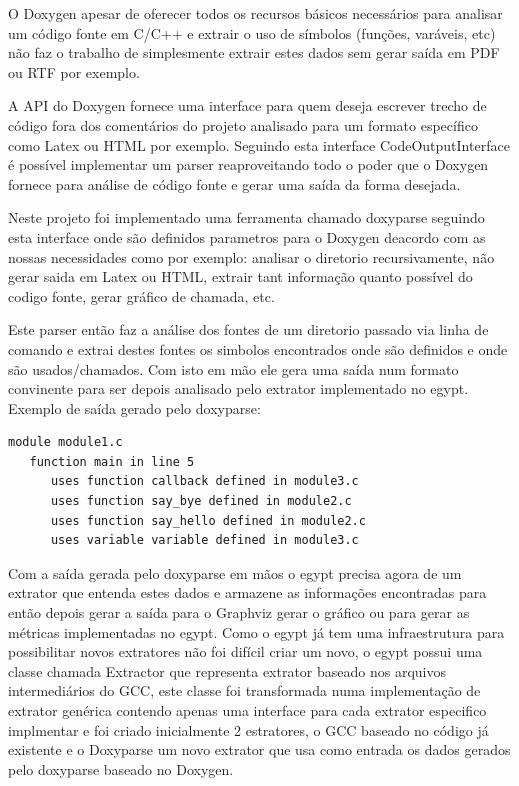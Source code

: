O Doxygen apesar de oferecer todos os recursos básicos necessários para analisar um código fonte em C/C++ e extrair o uso de símbolos (funções, varáveis, etc) não faz o trabalho de simplesmente extrair estes dados sem gerar saída em PDF ou RTF por exemplo.

A API do Doxygen fornece uma interface para quem deseja escrever trecho de código fora dos comentários do projeto analisado para um formato específico como Latex ou HTML por exemplo. Seguindo esta interface CodeOutputInterface é possível implementar um parser reaproveitando todo o poder que o Doxygen fornece para análise de código fonte e gerar uma saída da forma desejada.

Neste projeto foi implementado uma ferramenta chamado doxyparse seguindo esta interface onde são definidos parametros para o Doxygen deacordo com as nossas necessidades como por exemplo: analisar o diretorio recursivamente, não gerar saida em Latex ou HTML, extrair tant informação quanto possível do codigo fonte, gerar gráfico de chamada, etc.

Este parser então faz a análise dos fontes de um diretorio passado via linha de comando e extrai destes fontes os simbolos encontrados onde são definidos e onde são usados/chamados. Com isto em mão ele gera uma saída num formato convinente para ser depois analisado pelo extrator implementado no egypt. Exemplo de saída gerado pelo doxyparse:

\begin{verbatim}
module module1.c
   function main in line 5
      uses function callback defined in module3.c
      uses function say_bye defined in module2.c
      uses function say_hello defined in module2.c
      uses variable variable defined in module3.c
\end{verbatim}

Com a saída gerada pelo doxyparse em mãos o egypt precisa agora de um extrator que entenda estes dados e armazene as informações encontradas para então depois gerar a saída para o Graphviz gerar o gráfico ou para gerar as métricas implementadas no egypt. Como o egypt já tem uma infraestrutura para possibilitar novos extratores não foi difícil criar um novo, o egypt possui uma classe chamada Extractor que representa extrator baseado nos arquivos intermediários do GCC, este classe foi transformada numa implementação de extrator genérica contendo apenas uma interface para cada extrator especifico implmentar e foi criado inicialmente 2 estratores, o GCC baseado no código já existente e o Doxyparse um novo extrator que usa como entrada os dados gerados pelo doxyparse baseado no Doxygen.

